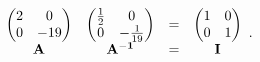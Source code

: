 \documentclass[11pt]{article}
\begin{document}
\[
\begin{array} {c c c c} {\left( \begin{matrix} {2} & {0} \\ {0} & {-1 9} \\ \end{matrix} \right)} & {\left( \begin{matrix} {\frac{1} {2}} & {0} \\ {0} & {-\frac{1} {1 9}} \\ \end{matrix} \right)} & {=} & {\left( \begin{matrix} {1} & {0} \\ {0} & {1} \\ \end{matrix} \right)} \\ {\bf{A}} & {\bf{A}^{-1}} & {=} & {\bf{I}} \\ \end{array} .
\]
\end{document}
